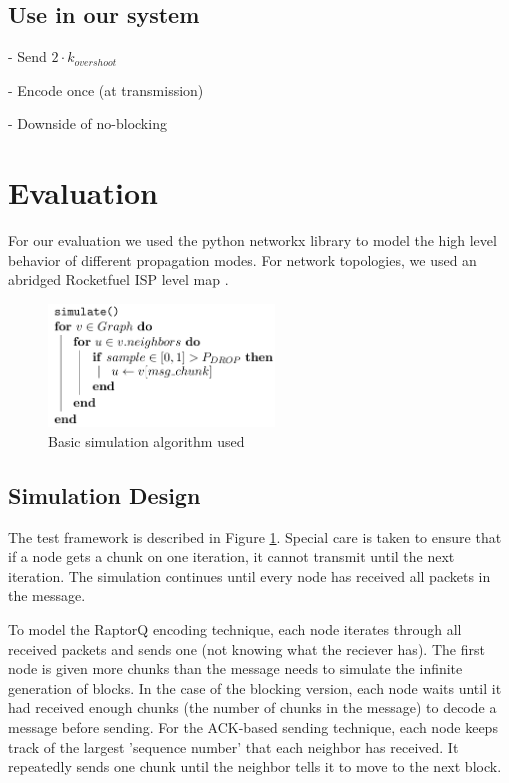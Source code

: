 \subsection{Use in our system}
-   Send  $2\cdot k_{overshoot}$

-   Encode once (at transmission)

-   Downside of no-blocking


\section{Evaluation}
For our evaluation we used the python networkx library to model the high level behavior of different propagation modes\cite{nwx}. 
For network topologies, we used an abridged Rocketfuel ISP level map \cite{rocketfuel}.

\begin{figure}[tp]
\centering
\includegraphics[width=6cm]{figures/simulate_algo.png}
\caption{Basic simulation algorithm used}
\label{algo:a1}
\end{figure}

\subsection{Simulation Design}
The test framework is described in Figure \ref{algo:a1}. Special care is taken to ensure that if a node gets a chunk on one iteration, it cannot transmit until the next iteration. The simulation continues until every node has received all packets in the message.  

To model the RaptorQ encoding technique, each node iterates through all received packets and sends one (not knowing what the reciever has). The first node is given more chunks than the message needs to simulate the infinite generation of blocks. In the case of the blocking version, each node waits until it had received enough chunks (the number of chunks in the message) to decode a message before sending. For the ACK-based sending technique, each node keeps track of the largest 'sequence number' that each neighbor has received. It repeatedly sends one chunk until the neighbor tells it to move to the next block.

